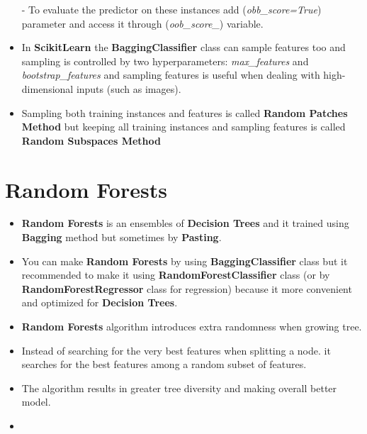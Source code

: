 \documentclass{article}
\begin{document}
\begin{itemize}
    	- To evaluate the predictor on these instances add (\textit{obb\_score=True}) parameter and access it through (\textit{oob\_score\_}) variable.
    	\item In \textbf{Scikit\textendash Learn} the \textbf{BaggingClassifier} class can sample features too and sampling is controlled by two hyperparameters: \textit{max\_features} and \textit{bootstrap\_features} and sampling features is useful when dealing with high-dimensional inputs (such as images).
    	\item Sampling both training instances and features is called \textbf{Random Patches Method} but keeping all training instances and sampling features is called \textbf{Random Subspaces Method}
    	
    \end{itemize}
    \section{Random Forests} 
    \begin{itemize}
		\item \textbf{Random Forests} is an ensembles of \textbf{Decision Trees} and it trained using \textbf{Bagging} method but sometimes by \textbf{Pasting}.
		\item You can make \textbf{Random Forests} by using \textbf{BaggingClassifier} class but it recommended to make it using \textbf{RandomForestClassifier} class (or by \textbf{RandomForestRegressor} class for regression) because it more convenient and optimized for \textbf{Decision Trees}.  
		\item \textbf{Random Forests} algorithm introduces extra randomness  when growing tree.
		\item Instead of searching for the very best features when splitting a node. it searches for the best features among a random subset of features. 
		\item The algorithm results in greater tree diversity and making overall better model.
		\item 
    \end{itemize}
\end{document}
